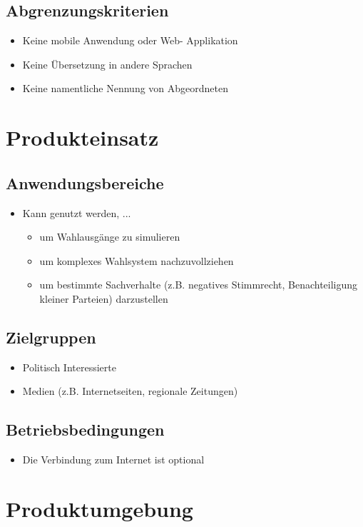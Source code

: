 \documentclass[10pt,a4paper]{article}
\begin{document}
\subsection{Abgrenzungskriterien}
\begin{itemize}
\item Keine mobile Anwendung oder Web- Applikation
\item Keine Übersetzung in andere Sprachen
\item Keine namentliche Nennung von Abgeordneten
\end{itemize}


\section{Produkteinsatz}
\subsection{Anwendungsbereiche}
\begin{itemize}
\item Kann genutzt werden, ...
\begin{itemize}
\item um Wahlausgänge zu simulieren
\item um komplexes Wahlsystem nachzuvollziehen 
\item um bestimmte Sachverhalte (z.B. negatives Stimmrecht, Benachteiligung kleiner Parteien) darzustellen 
\end{itemize} 
\end{itemize}


\subsection{Zielgruppen}
\begin{itemize}
\item Politisch Interessierte
\item Medien (z.B. Internetseiten, regionale Zeitungen)
\end{itemize}


\subsection{Betriebsbedingungen}
\begin{itemize}
\item Die Verbindung zum Internet ist optional
\end{itemize}


\section{Produktumgebung}
\end{document}
